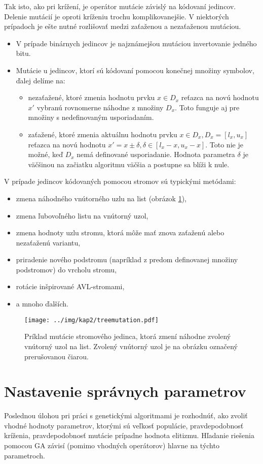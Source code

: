 Tak isto, ako pri krížení, je operátor mutácie závislý na kódovaní jedincov. Delenie mutácií je oproti kríženiu trochu komplikovanejšie. V niektorých prípadoch je ešte nutné rozlišovať medzi zaťaženou a nezaťaženou mutáciou. 
\begin{itemize}
\item V prípade binárnych jedincov je najznámejšou mutáciou invertovanie jedného bitu.
\item Mutácie u jedincov, ktorí sú kódovaní pomocou konečnej množiny symbolov, ďalej delíme na:
\begin{itemize}
\item nezaťažené, ktoré zmenia hodnotu prvku $x \in D_x$ reťazca na novú hodnotu $x'$ vybranú rovnomerne náhodne z množiny $D_x$. Toto funguje aj pre množiny s nedefinovaným usporiadaním.
\item zaťažené, ktoré zmenia aktuálnu hodnotu prvku $x \in D_x, D_x = [l_x,u_x]$ reťazca na novú hodnotu $x' = x \pm \delta, \delta \in [l_x - x, u_x - x]$. Toto nie je možné, keď $D_x$ nemá definované usporiadanie. Hodnota parametra $\delta$ je väčšinou na začiatku algoritmu väčšia a postupne sa blíži k nule.
\end{itemize}
\end{itemize}
V prípade jedincov kódovaných pomocou stromov sú typickými metódami:
\begin{itemize}
\item zmena náhodného vnútorného uzlu na list (obrázok \ref{fig:TreeMutation}),
\item zmena ľubovoľného listu na vnútorný uzol,
\item zmena hodnoty uzlu stromu, ktorá môže mať znova zaťaženú alebo nezaťaženú variantu,
\item priradenie nového podstromu (napríklad z predom definovanej množiny podstromov) do vrcholu stromu,
\item rotácie inšpirované AVL-stromami,
\item a mnoho ďalších.
\end{itemize}

\begin{figure}[h]
\centering
\centerline{\mbox{\texttt{[image: ../img/kap2/treemutation.pdf]}}}
\caption{Príklad mutácie stromového jedinca, ktorá zmení náhodne zvolený vnútorný uzol na list. Zvolený vnútorný uzol je na obrázku označený prerušovanou čiarou.}\label{fig:TreeMutation}
\end{figure}

\section{Nastavenie správnych parametrov}\label{kap2:2.6:Parameters}
Poslednou úlohou pri práci s genetickými algoritmami je rozhodnúť, ako zvoliť vhodné hodnoty parametrov, ktorými sú veľkosť populácie, pravdepodobnosť kríženia, pravdepodobnosť mutácie prípadne hodnota elitizmu. Hľadanie riešenia pomocou GA závisí (pomimo vhodných operátorov) hlavne na týchto parametroch.

